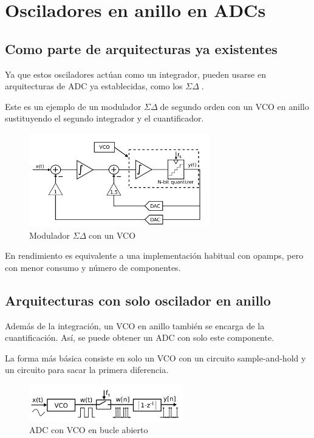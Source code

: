 \documentclass[12pt]{report} %
\newcommand{\sigmadelta}{$\Sigma\Delta\; $}
\begin{document}
	\section{Osciladores en anillo en ADCs}
	
	\subsection{Como parte de arquitecturas ya existentes}
	Ya que estos osciladores actúan como un integrador, pueden usarse en arquitecturas de ADC ya establecidas, como los \sigmadelta.
	
	Este es un ejemplo de un modulador \sigmadelta de segundo orden con un VCO en anillo sustituyendo el segundo integrador y el cuantificador.
	\begin{figure}[H]
		\includegraphics[width=0.7\textwidth]{sd-with-vco.png}
		\caption[Modulador \sigmadelta con un VCO]{Modulador \sigmadelta con un VCO\protect\footnotemark}
		\label{fig:sd-with-vco.png}
	\end{figure}
	
	En rendimiento es equivalente a una implementación habitual con opamps, pero con menor consumo y número de componentes. %
	
	\subsection{Arquitecturas con solo oscilador en anillo}

	Además de la integración, un VCO en anillo también se encarga de la cuantificación. Así, se puede obtener un ADC con solo este componente.
	
	La forma más básica consiste en solo un VCO con un circuito sample-and-hold y un circuito para sacar la primera diferencia.
	\begin{figure}[H]
		\includegraphics[width=0.6\textwidth]{vco-adc-open-loop.png}
		\caption[ADC con VCO en bucle abierto]{ADC con VCO en bucle abierto\protect\footnotemark}
		\label{fig:vco-adc-open-loop.png}
	\end{figure}
	
\end{document}
